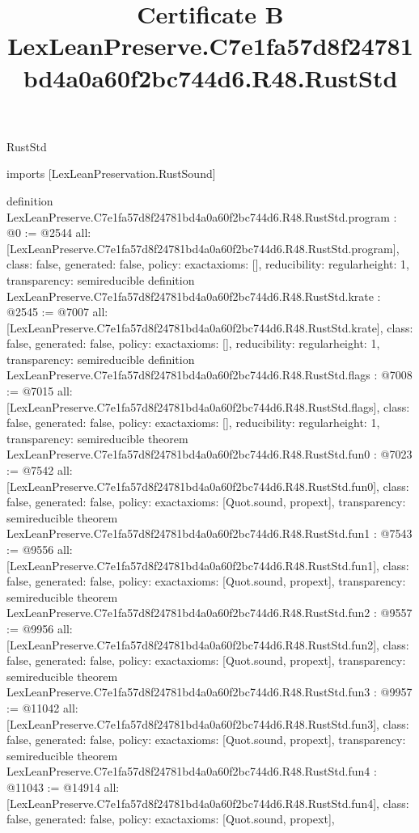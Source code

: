 \begin{lexlean}{RustStd}
\title{Certificate B LexLeanPreserve.C7e1fa57d8f24781bd4a0a60f2bc744d6.R48.RustStd}
\begin{coremodule}
imports [LexLeanPreservation.RustSound]

definition LexLeanPreserve.C7e1fa57d8f24781bd4a0a60f2bc744d6.R48.RustStd.program : @0 := @2544 {
  all: [LexLeanPreserve.C7e1fa57d8f24781bd4a0a60f2bc744d6.R48.RustStd.program],
  class: false,
  generated: false,
  policy: exact{axioms: []},
  reducibility: regular{height: 1},
  transparency: semireducible
}
definition LexLeanPreserve.C7e1fa57d8f24781bd4a0a60f2bc744d6.R48.RustStd.krate : @2545 := @7007 {
  all: [LexLeanPreserve.C7e1fa57d8f24781bd4a0a60f2bc744d6.R48.RustStd.krate],
  class: false,
  generated: false,
  policy: exact{axioms: []},
  reducibility: regular{height: 1},
  transparency: semireducible
}
definition LexLeanPreserve.C7e1fa57d8f24781bd4a0a60f2bc744d6.R48.RustStd.flags : @7008 := @7015 {
  all: [LexLeanPreserve.C7e1fa57d8f24781bd4a0a60f2bc744d6.R48.RustStd.flags],
  class: false,
  generated: false,
  policy: exact{axioms: []},
  reducibility: regular{height: 1},
  transparency: semireducible
}
theorem LexLeanPreserve.C7e1fa57d8f24781bd4a0a60f2bc744d6.R48.RustStd.fun0 : @7023 := @7542 {
  all: [LexLeanPreserve.C7e1fa57d8f24781bd4a0a60f2bc744d6.R48.RustStd.fun0],
  class: false,
  generated: false,
  policy: exact{axioms: [Quot.sound, propext]},
  transparency: semireducible
}
theorem LexLeanPreserve.C7e1fa57d8f24781bd4a0a60f2bc744d6.R48.RustStd.fun1 : @7543 := @9556 {
  all: [LexLeanPreserve.C7e1fa57d8f24781bd4a0a60f2bc744d6.R48.RustStd.fun1],
  class: false,
  generated: false,
  policy: exact{axioms: [Quot.sound, propext]},
  transparency: semireducible
}
theorem LexLeanPreserve.C7e1fa57d8f24781bd4a0a60f2bc744d6.R48.RustStd.fun2 : @9557 := @9956 {
  all: [LexLeanPreserve.C7e1fa57d8f24781bd4a0a60f2bc744d6.R48.RustStd.fun2],
  class: false,
  generated: false,
  policy: exact{axioms: [Quot.sound, propext]},
  transparency: semireducible
}
theorem LexLeanPreserve.C7e1fa57d8f24781bd4a0a60f2bc744d6.R48.RustStd.fun3 : @9957 := @11042 {
  all: [LexLeanPreserve.C7e1fa57d8f24781bd4a0a60f2bc744d6.R48.RustStd.fun3],
  class: false,
  generated: false,
  policy: exact{axioms: [Quot.sound, propext]},
  transparency: semireducible
}
theorem LexLeanPreserve.C7e1fa57d8f24781bd4a0a60f2bc744d6.R48.RustStd.fun4 : @11043 := @14914 {
  all: [LexLeanPreserve.C7e1fa57d8f24781bd4a0a60f2bc744d6.R48.RustStd.fun4],
  class: false,
  generated: false,
  policy: exact{axioms: [Quot.sound, propext]},
}
\end{coremodule}
\end{lexlean}
